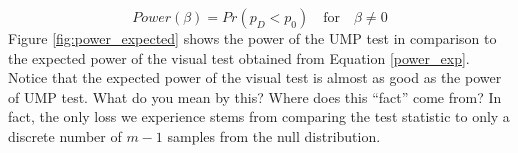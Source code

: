 \documentclass{article}
\newcommand{\green}[1]{{\color{green} #1}} %
\newtheorem{thm}{Theorem}[section]
\begin{document}
\begin{equation}\label{power_exp} 
   Power(\beta)=Pr(p_{D} < p_0)  \quad \text{for}  \quad \beta \ne 0
\end{equation}
Figure \ref{fig:power_expected} shows the power of the UMP test in comparison to the expected power of the visual test obtained from Equation \ref{power_exp}. Notice that the expected power of the visual test is almost as good as the power of UMP test. \green{What do you mean by this? Where does this ``fact'' come from?} In fact, the only loss we experience stems from comparing the test statistic to only a discrete number of  $m-1$ samples from the null distribution. 

% 
%
%
%
%
%
\end{document}
